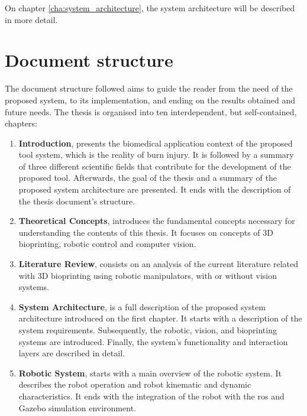 On chapter \ref{cha:system_architecture}, the system architecture will be described in more detail.


\section{Document structure}
\label{sec:document_structure}

The document structure followed aims to guide the reader from the need of the proposed system, to its implementation, and ending on the results obtained and future needs. The thesis is organised into ten interdependent, but self-contained, chapters:

\begin{enumerate}
    \item \textbf{Introduction}, presents the biomedical application context of the proposed tool system, which is the reality of burn injury. It is followed by a summary of three different scientific fields that contribute for the development of the proposed tool. Afterwards, the goal of the thesis and a summary of the proposed system architecture are presented. It ends with the description of the thesis document's structure.
    
    \item \textbf{Theoretical Concepts}, introduces the fundamental concepts necessary for understanding the contents of this thesis. It focuses on concepts of 3D bioprinting, robotic control and computer vision. 
    
    \item \textbf{Literature Review}, consists on an analysis of the current literature related with 3D bioprinting using robotic manipulators, with or without vision systems.
    
    \item \textbf{System Architecture}, is a full description of the proposed system architecture introduced on the first chapter. It starts with a description of the system requirements. Subsequently, the robotic, vision, and bioprinting systems are introduced. Finally, the system's functionality and interaction layers are described in detail.
    
    \item \textbf{Robotic System}, starts with a main overview of the robotic system. It describes the robot operation and robot kinematic and dynamic characteristics. It ends with the integration of the robot with the \gls{ros} and Gazebo simulation environment.
    

\end{enumerate}
